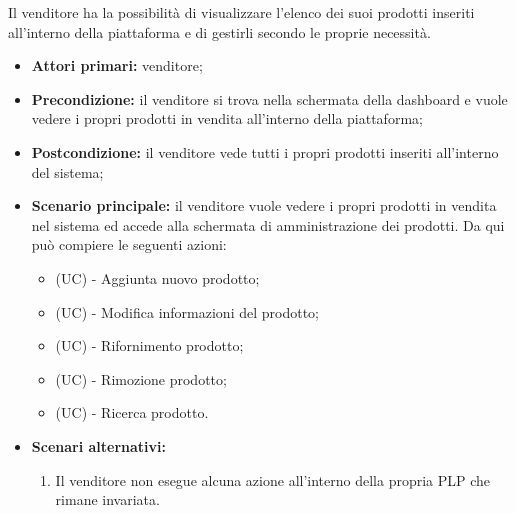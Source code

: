 Il venditore ha la possibilità di visualizzare l'elenco dei suoi prodotti inseriti all'interno della piattaforma e di gestirli secondo le proprie necessità.
\begin{itemize}
	\item \textbf{Attori primari:} venditore;
	\item \textbf{Precondizione:} il venditore si trova nella schermata della dashboard e vuole vedere i propri prodotti in vendita all'interno della piattaforma;
	\item \textbf{Postcondizione:} il venditore vede tutti i propri prodotti inseriti all'interno del sistema;
	\item \textbf{Scenario principale:} il venditore vuole vedere i propri prodotti in vendita nel sistema ed accede alla schermata di amministrazione dei prodotti. Da qui può compiere le seguenti azioni:
	\begin{itemize}
		\item (UC) - Aggiunta nuovo prodotto;
		\item (UC) - Modifica informazioni del prodotto;
		\item (UC) - Rifornimento prodotto;
		\item (UC) - Rimozione prodotto;
		\item (UC) - Ricerca prodotto.
	\end{itemize}
	\item \textbf{Scenari alternativi:}
	\begin{enumerate}[label=\lett]
		\item Il venditore non esegue alcuna azione all'interno della propria PLP che rimane invariata.
	\end{enumerate}
\end{itemize}


